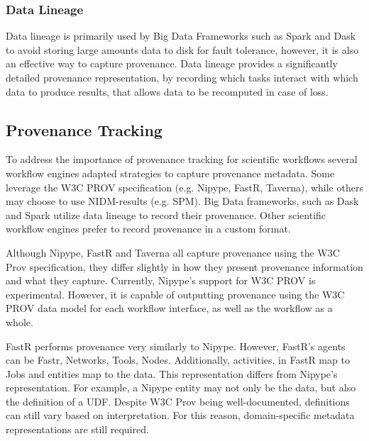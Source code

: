             \subsubsection{Data Lineage}
                Data lineage is primarily used by Big Data Frameworks such as
                Spark and Dask to avoid storing large amounts data to disk for
                fault tolerance, however, it is also an effective way to capture
                provenance. Data lineage provides a significantly detailed
                provenance representation, by recording which tasks interact
                with which data to produce results, that allows data to be
                recomputed in case of loss. 

        \subsection{Provenance Tracking}\label{prov}

            To address the importance of provenance tracking for scientific
            workflows several workflow engines adapted strategies to capture
            provenance metadata. Some leverage the W3C PROV specification (e.g.
            Nipype, FastR, Taverna), while others may choose to use NIDM-results
            (e.g. SPM). Big Data frameworks, such as Dask and Spark utilize data
            lineage to record their provenance. Other scientific workflow engines
            prefer to record provenance in a custom format.

            Although Nipype, FastR and Taverna all capture provenance using the
            W3C Prov specification, they differ slightly in how they present
            provenance information and what they capture. Currently, Nipype's
            support for W3C PROV is experimental. However, it is capable of
            outputting provenance using the W3C PROV data model for each
            workflow interface, as well as the workflow as a whole.
    
            FastR performs provenance very similarly to Nipype. However, FastR's
            agents can be Fastr, Networks, Tools, Nodes. Additionally,
            activities, in FastR map to Jobs and entities map to the data. This
            representation differs from Nipype's representation. For example, a
            Nipype entity may not only be the data, but also the definition of a
            UDF. Despite W3C Prov being well-documented, definitions can still
            vary based on interpretation. For this reason, domain-specific
            metadata representations are still required.
    

